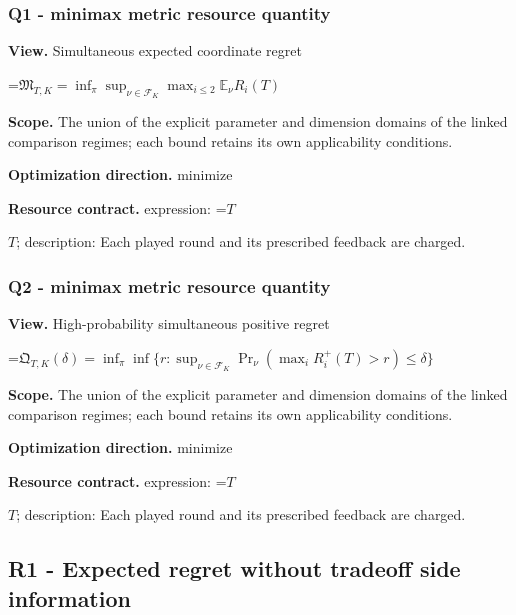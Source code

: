 \documentclass[10pt,a4paper]{article}
\newcommand{\AtlasMath}[1]{\par\begingroup\centering\setbox0=\hbox{$\displaystyle #1$}\ifdim\wd0>1.4\linewidth\typeout{ATLAS WIDE FORMULA: \the\wd0}\fi\ifdim\wd0>\linewidth\resizebox{\linewidth}{!}{\box0}\else\box0\fi\par\endgroup}
\newcommand{\AtlasInlineMath}[1]{\begingroup\setbox0=\hbox{$#1$}\ifdim\wd0>.4\linewidth\endgroup\AtlasMath{#1}\else\endgroup$#1$\fi}
\begin{document}
\subsubsection{Q1 - minimax metric resource quantity}


\textbf{View.} Simultaneous expected coordinate regret



\AtlasMath{\mathfrak M_{T,K}=\inf_\pi\sup_{\nu\in\mathcal F_K}\max_{i\le2}\mathbb E_\nu R_i(T)}


\textbf{Scope.} The union of the explicit parameter and dimension domains of the linked comparison regimes; each bound retains its own applicability conditions.



\textbf{Optimization direction.} minimize



\textbf{Resource contract.} expression: \AtlasInlineMath{T}; description: Each played round and its prescribed feedback are charged.



\subsubsection{Q2 - minimax metric resource quantity}


\textbf{View.} High-probability simultaneous positive regret



\AtlasMath{\mathfrak Q_{T,K}(\delta)=\inf_\pi\inf\{r:\sup_{\nu\in\mathcal F_K}\Pr_\nu(\max_iR_i^+(T)>r)\le\delta\}}


\textbf{Scope.} The union of the explicit parameter and dimension domains of the linked comparison regimes; each bound retains its own applicability conditions.



\textbf{Optimization direction.} minimize



\textbf{Resource contract.} expression: \AtlasInlineMath{T}; description: Each played round and its prescribed feedback are charged.



\subsection{R1 - Expected regret without tradeoff side information}
\end{document}
